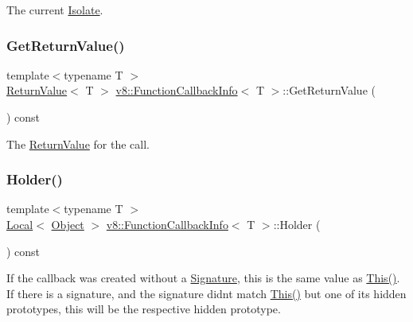 The current \mbox{\hyperlink{classv8_1_1Isolate}{Isolate}}. \mbox{\label{classv8_1_1FunctionCallbackInfo_a2cb41afe1e098a46d27d901b4cc1e6f5}} 
\subsubsection{\texorpdfstring{Get\+Return\+Value()}{GetReturnValue()}}
{\footnotesize\ttfamily template$<$typename T $>$ \\
\mbox{\hyperlink{classv8_1_1ReturnValue}{Return\+Value}}$<$ T $>$ \mbox{\hyperlink{classv8_1_1FunctionCallbackInfo}{v8\+::\+Function\+Callback\+Info}}$<$ T $>$\+::Get\+Return\+Value (\begin{DoxyParamCaption}{ }\end{DoxyParamCaption}) const}

The \mbox{\hyperlink{classv8_1_1ReturnValue}{Return\+Value}} for the call. \mbox{\label{classv8_1_1FunctionCallbackInfo_a708ab465862ed796e3b0b3c37ba05044}} 
\subsubsection{\texorpdfstring{Holder()}{Holder()}}
{\footnotesize\ttfamily template$<$typename T $>$ \\
\mbox{\hyperlink{classv8_1_1Local}{Local}}$<$ \mbox{\hyperlink{classv8_1_1Object}{Object}} $>$ \mbox{\hyperlink{classv8_1_1FunctionCallbackInfo}{v8\+::\+Function\+Callback\+Info}}$<$ T $>$\+::Holder (\begin{DoxyParamCaption}{ }\end{DoxyParamCaption}) const}

If the callback was created without a \mbox{\hyperlink{classv8_1_1Signature}{Signature}}, this is the same value as \mbox{\hyperlink{classv8_1_1FunctionCallbackInfo_a4ddfd6d21732dff1c4c55d5441a8a5ca}{This()}}. If there is a signature, and the signature didn\textquotesingle{}t match \mbox{\hyperlink{classv8_1_1FunctionCallbackInfo_a4ddfd6d21732dff1c4c55d5441a8a5ca}{This()}} but one of its hidden prototypes, this will be the respective hidden prototype.

